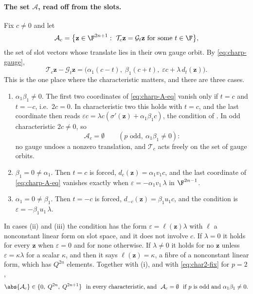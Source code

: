 \paragraph{The set $\mathcal A$, read off from the slots.}
Fix $c\neq0$ and let
\[
   \mathcal A_c=\bigl\{\mathbf z\in\F^{2n+1}:\
   \mathcal T_c\mathbf z=\mathcal G_t\mathbf z\text{ for some }t\in\F\bigr\},
\]
the set of slot vectors whose translate lies in their own gauge orbit.  By
\eqref{eq:charp-gauge},
\begin{equation}
   \mathcal T_c\mathbf z-\mathcal G_t\mathbf z
   =\bigl(\alpha_1(c-t),\;\beta_1(c+t),\;\varepsilon c+\lambda\,d_t(\mathbf z)\bigr).
   \label{eq:charp-A-eq}
\end{equation}
This is the one place where the characteristic matters, and there are three cases.
\begin{enumerate}
\item[(i)] $\alpha_1\beta_1\neq0$.  The first two coordinates of \eqref{eq:charp-A-eq}
   vanish only if $t=c$ and $t=-c$, i.e.\ $2c=0$.  In characteristic two this holds with
   $t=c$, and the last coordinate then reads
   $\varepsilon c=\lambda c(\sigma'(\mathbf z)+\alpha_1\beta_1c)$, the condition of
   \Cref{thm:char2-lower}.  In odd characteristic $2c\neq0$, so
   \[
      \mathcal A_c=\emptyset\qquad(p\text{ odd},\ \alpha_1\beta_1\neq0):
   \]
   no gauge undoes a nonzero translation, and $\mathcal T_c$ acts freely on the set of
   gauge orbits.
\item[(ii)] $\beta_1=0\neq\alpha_1$.  Then $t=c$ is forced, $d_c(\mathbf z)=\alpha_1v_1c$,
   and the last coordinate of \eqref{eq:charp-A-eq} vanishes exactly when
   $\varepsilon=-\alpha_1v_1\,\lambda$ in $\F^{2n-1}$.
\item[(iii)] $\alpha_1=0\neq\beta_1$.  Then $t=-c$ is forced, $d_{-c}(\mathbf z)=\beta_1u_1c$,
   and the condition is $\varepsilon=-\beta_1u_1\,\lambda$.
\end{enumerate}
In cases (ii) and (iii) the condition has the form $\varepsilon=\ell(\mathbf z)\lambda$
with $\ell$ a nonconstant linear form on slot space, and it does not involve $c$.  If
$\lambda=0$ it holds for every $\mathbf z$ when $\varepsilon=0$ and for none otherwise.  If
$\lambda\neq0$ it holds for no $\mathbf z$ unless $\varepsilon=\kappa\lambda$ for a scalar
$\kappa$, and then it says $\ell(\mathbf z)=\kappa$, a fibre of a nonconstant linear form,
which has $Q^{2n}$ elements.  Together with (i), and with \eqref{eq:char2-fix} for $p=2$,
\begin{equation}
   \abs{\mathcal A_c}\in\{0,\;Q^{2n},\;Q^{2n+1}\}\ \text{ in every characteristic, and }\
   \mathcal A_c=\emptyset\ \text{ if $p$ is odd and }\alpha_1\beta_1\neq0 .
   \label{eq:charp-fix}
\end{equation}

